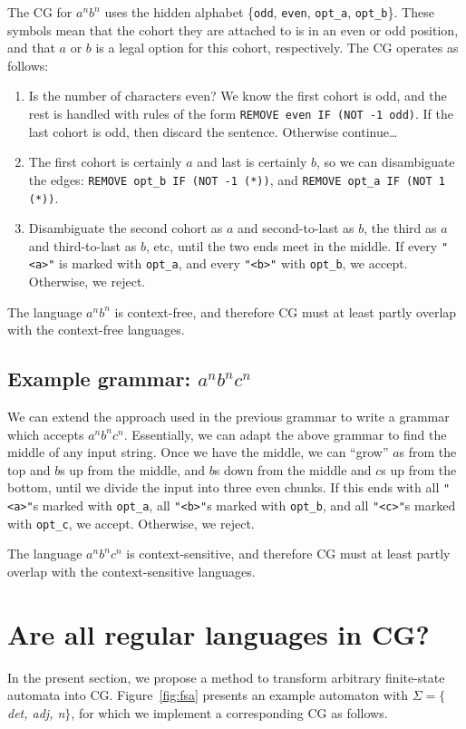 \documentclass[11pt]{article}
\def\t#1{\texttt{#1}}
\begin{document}
The CG for $a^nb^n$ uses the hidden alphabet \{\t{odd}, \t{even}, \t{opt\_a},
\t{opt\_b}\}. These symbols mean that the cohort they are attached to is in an
even or odd position, and that $a$ or $b$ is a legal option for this cohort,
respectively. The CG operates as follows: 
\begin{enumerate}
\item
  Is the number of characters even? We know the first cohort is odd, and the
  rest is handled with rules of the form \t{REMOVE even IF (NOT -1 odd)}. If the
  last cohort is odd, then discard the sentence. Otherwise continue\dots
\item
  The first cohort is certainly $a$ and last is certainly $b$, so we can
  disambiguate the edges: 
  \t{REMOVE opt\_b IF (NOT -1 (*))}, and \t{REMOVE opt\_a IF (NOT 1 (*))}. 
\item
  Disambiguate the second cohort as $a$ and second-to-last as $b$, the third as
  $a$ and third-to-last as $b$, etc, until the two ends meet in the middle. If
  every \t{"<a>"} is marked with \t{opt\_a}, and every \t{"<b>"} with
  \t{opt\_b}, we accept. Otherwise, we reject.  
\end{enumerate}
The language $a^nb^n$ is context-free, and therefore CG must at least partly
overlap with the context-free languages.

\subsection{Example grammar: $a^nb^nc^n$}
We can extend the approach used in the previous grammar to write a grammar which
accepts $a^nb^nc^n$. Essentially, we can adapt the above grammar to find the
middle of any input string. Once we have the middle, we can ``grow'' $a$s from
the top and $b$s up from the middle, and $b$s down from the middle and $c$s up
from the bottom, until we divide the input into three even chunks.
If this ends with all \t{"<a>"}s marked with \t{opt\_a}, all \t{"<b>"}s marked
with \t{opt\_b}, and all \t{"<c>"}s marked with \t{opt\_c}, we accept.
Otherwise, we reject.

The language $a^nb^nc^n$ is context-sensitive, and therefore CG must at least
partly overlap with the context-sensitive languages. 


\section{Are all regular languages in CG?}
In the present section, we propose a method to transform arbitrary finite-state
automata into CG. Figure~\ref{fig:fsa} presents an example automaton with
$\Sigma = \{$\emph{det, adj, n}$\}$, for which we implement a corresponding CG
as follows.
\end{document}
